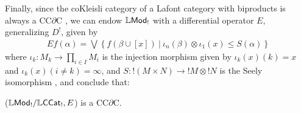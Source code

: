 Finally, since the coKleisli category of a Lafont category with biproducts is always a CC$\partial$C \cite[Theorem 21]{LemayCALCO2021}, we can endow $\mathbb{L}\mathsf{Mod}_{!}$ with a  differential operator $E$,  generalizing $D^{!}$, given by 
\begin{align}\label{eq:dermod}
Ef(\alpha)=
\bigvee\left\{
f(\beta\cup [x]) \ \Big \vert  \ 
\iota_{n}(\beta)\otimes \iota_{1}(x) \leq S(\alpha)
\right\}
\end{align}
where $\iota_{k}: M_{k}\to \prod_{i\in I}M_{i}$ is the injection morphism given by $\iota_{k}(x)( k)=x$ and $\iota_{k}(x)(i\neq k)=\infty$,
and $S: !(M\times N)\to !M\otimes !N$ is the Seely isomorphism \cite{Mellies2018}, and conclude that:
\begin{theorem}\label{thm:lemay}
($\mathbb{L}\mathsf{Mod}_{!}/\mathbb{L}\mathsf{CCat}_{!},E$) is a CC$\partial$C.
\end{theorem}




